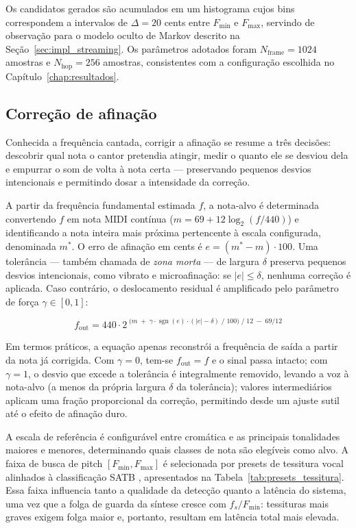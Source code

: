 Os candidatos gerados são acumulados em um histograma cujos bins correspondem a intervalos de $\Delta = 20$ cents entre $F_{\min}$ e $F_{\max}$, servindo de observação para o modelo oculto de Markov descrito na Seção~\ref{sec:impl_streaming}. Os parâmetros adotados foram $N_{\text{frame}} = 1024$ amostras e $N_{\text{hop}} = 256$ amostras, consistentes com a configuração escolhida no Capítulo~\ref{chap:resultados}.

\subsection{Correção de afinação}

Conhecida a frequência cantada, corrigir a afinação se resume a três decisões: descobrir qual nota o cantor pretendia atingir, medir o quanto ele se desviou dela e empurrar o som de volta à nota certa --- preservando pequenos desvios intencionais e permitindo dosar a intensidade da correção.

A partir da frequência fundamental estimada $f$, a nota-alvo é determinada convertendo $f$ em nota MIDI contínua ($m = 69 + 12\log_2(f/440)$) e identificando a nota inteira mais próxima pertencente à escala configurada, denominada $m^*$. O erro de afinação em cents é $e = (m^* - m) \cdot 100$. Uma tolerância --- também chamada de \textit{zona morta} --- de largura $\delta$ preserva pequenos desvios intencionais, como vibrato e microafinação: se $|e| \leq \delta$, nenhuma correção é aplicada. Caso contrário, o deslocamento residual é amplificado pelo parâmetro de força $\gamma \in [0,1]$:

\begin{equation}
f_{\text{out}} = 440 \cdot 2^{\;\bigl(m \;+\; \gamma \cdot \operatorname{sgn}(e) \cdot (|e| - \delta)\;/\;100\bigr)\;/\;12 \;-\; 69/12}
\end{equation}

Em termos práticos, a equação apenas reconstrói a frequência de saída a partir da nota já corrigida. Com $\gamma = 0$, tem-se $f_{\text{out}} = f$ e o sinal passa intacto; com $\gamma = 1$, o desvio que excede a tolerância é integralmente removido, levando a voz à nota-alvo (a menos da própria largura $\delta$ da tolerância); valores intermediários aplicam uma fração proporcional da correção, permitindo desde um ajuste sutil até o efeito de afinação duro.

A escala de referência é configurável entre cromática e as principais tonalidades maiores e menores, determinando quais classes de nota são elegíveis como alvo. A faixa de busca de pitch $[F_{\min}, F_{\max}]$ é selecionada por presets de tessitura vocal alinhados à classificação SATB \cite{aalto_speech_properties}, apresentados na Tabela~\ref{tab:presets_tessitura}. Essa faixa influencia tanto a qualidade da detecção quanto a latência do sistema, uma vez que a folga de guarda da síntese cresce com $f_s / F_{\min}$: tessituras mais graves exigem folga maior e, portanto, resultam em latência total mais elevada.

